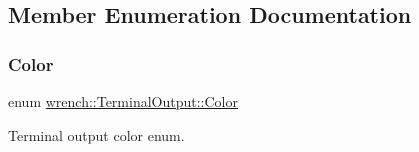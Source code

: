 \subsection{Member Enumeration Documentation}
\mbox{\label{classwrench_1_1_terminal_output_a793daa5c24c3613b398f801a75bfa1e0}} 
\subsubsection{\texorpdfstring{Color}{Color}}
{\footnotesize\ttfamily enum \hyperlink{classwrench_1_1_terminal_output_a793daa5c24c3613b398f801a75bfa1e0}{wrench\+::\+Terminal\+Output\+::\+Color}}



Terminal output color enum. 

